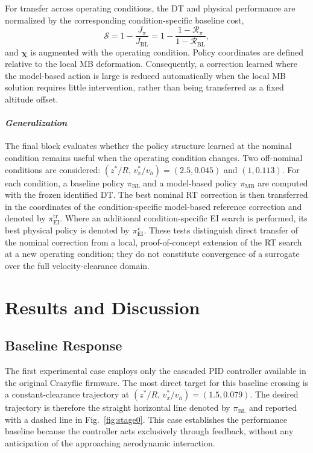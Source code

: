 \documentclass[journal]{IEEEtran}
\begin{document}
For transfer across operating conditions, the DT and physical performance are normalized by the corresponding condition-specific baseline cost,
\begin{equation}
 \mathcal S=1-\frac{J_{\pi}}{J_{\mathrm{BL}}}
   =1-\frac{1-\mathcal R_{\pi}}{1-\mathcal R_{\mathrm{BL}}},
 \label{eq:normalized-score}
\end{equation}
and $\boldsymbol{\chi}$ is augmented with the operating condition. Policy coordinates are defined relative to the local MB deformation. Consequently, a correction learned where the model-based action is large is reduced automatically when the local MB solution requires little intervention, rather than being transferred as a fixed altitude offset.

\paragraph*{\textit{Generalization}}
The final block evaluates whether the policy structure learned at the nominal condition remains useful when the operating condition changes. Two off-nominal conditions are considered: $(z^\ast/R,\,v_x^\ast/v_h)=(2.5,0.045)$ and $(1,0.113)$. For each condition, a baseline policy $\pi_{\mathrm{BL}}$ and a model-based policy $\pi_{\mathrm{MB}}$ are computed with the frozen identified DT. The best nominal RT correction is then transferred in the coordinates of the condition-specific model-based reference correction and denoted by $\pi_{\mathrm{EI}}^{\mathrm{tr}}$. Where an additional condition-specific EI search is performed, its best physical policy is denoted by $\pi_{\mathrm{EI}}^{\star}$. These tests distinguish direct transfer of the nominal correction from a local, proof-of-concept extension of the RT search at a new operating condition; they do not constitute convergence of a surrogate over the full velocity-clearance domain.


\section{Results and Discussion}
\label{sec:results}

\subsection{Baseline Response}
\label{sec:results-bl}

The first experimental case employs only the cascaded PID controller available in the original Crazyflie firmware. The most direct target for this baseline crossing is a constant-clearance trajectory at $(z^\ast/R,\,v_x^\ast/v_h)=(1.5,0.079)$. The desired trajectory is therefore the straight horizontal line denoted by $\pi_{\mathrm{BL}}$ and reported with a dashed line in Fig.~\ref{fig:stage0}. This case establishes the performance baseline because the controller acts exclusively through feedback, without any anticipation of the approaching aerodynamic interaction.
\end{document}
